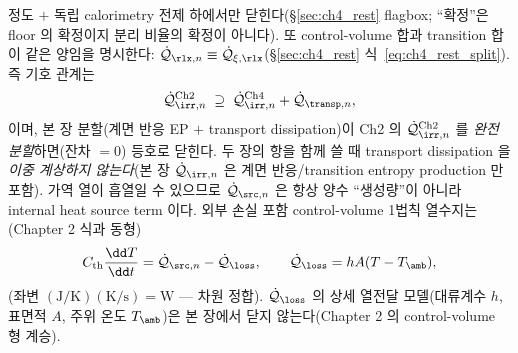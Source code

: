 정도 $+$ 독립 calorimetry 전제 하에서만 닫힌다(\S\ref{sec:ch4_rest} flagbox; ``확정''은 floor 의 확정이지
분리 비율의 확정이 아니다). 또 control-volume 합과 transition 합이 같은 양임을 명시한다:
$\dot{\mathcal Q}_{\rlx,n}\equiv\dot{\mathcal Q}_{\xi,\rlx}$(\S\ref{sec:ch4_rest} 식~\eqref{eq:ch4_rest_split}).
즉 기호 관계는
\begin{equation}
\dot{\mathcal Q}_{\irr,n}^{\mathrm{Ch2}}\;\supseteq\;\dot{\mathcal Q}_{\irr,n}^{\mathrm{Ch4}}+\dot{\mathcal Q}_{\transp,n},
\label{eq:ch4_ch2refine}
\end{equation}
이며, 본 장 분할(계면 반응 EP $+$ transport dissipation)이 Ch2 의 $\dot{\mathcal Q}_{\irr,n}^{\mathrm{Ch2}}$ 를
\emph{완전 분할}하면(잔차 $=0$) 등호로 닫힌다. 두 장의 항을 함께 쓸 때 transport dissipation 을 \emph{이중
계상하지 않는다}(본 장 $\dot{\mathcal Q}_{\irr,n}$
은 계면 반응/transition entropy production 만 포함). 가역 열이 흡열일 수 있으므로 $\dot{\mathcal Q}_{\src,n}$
은 항상 양수 ``생성량''이 아니라 internal heat source term 이다. 외부 손실 포함 control-volume 1법칙 열수지는
(Chapter 2 식과 동형)
\begin{equation}
C_{\mathrm{th}}\frac{\dd T}{\dd t}=\dot{\mathcal Q}_{\src,n}-\dot{\mathcal Q}_{\loss},\qquad
\dot{\mathcal Q}_{\loss}=hA(T-T_\amb),
\label{eq:ch4_balance}
\end{equation}
(좌변 $\mathrm{(J/K)(K/s)=W}$ — 차원 정합). $\dot{\mathcal Q}_{\loss}$ 의 상세 열전달 모델(대류계수 $h$, 표면적
$A$, 주위 온도 $T_\amb$)은 본 장에서 닫지 않는다(Chapter 2 의 control-volume 형 계승).

